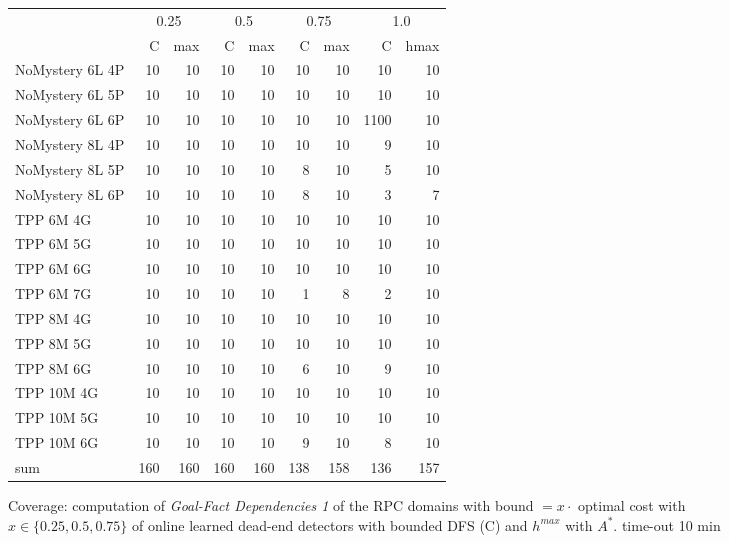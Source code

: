 \setlength{\tabcolsep}{1pt}
\begin{figure}[ht]
	\centering
	\scriptsize
	\begin{tabular}{l|rr|rr|rr|rr}
			& \multicolumn{2}{c}{0.25} & \multicolumn{2}{|c}{0.5} & \multicolumn{2}{|c}{0.75}& \multicolumn{2}{|c}{1.0}\\
		& C & max & C & max & C & max & C & hmax\\\hline
		NoMystery 6L 4P & 10 & 10 & 10 & 10 & 10 & 10 & 10 & 10\\
		NoMystery 6L 5P & 10 & 10 & 10 & 10 & 10 & 10 & 10 & 10\\
		NoMystery 6L 6P & 10 & 10 & 10 & 10 & 10 & 10 & 1100 & 10\\
		NoMystery 8L 4P & 10 & 10 & 10 & 10 & 10 & 10 & 9 & 10\\
		NoMystery 8L 5P & 10 & 10 & 10 & 10 & 8 & 10 & 5 & 10\\
		NoMystery 8L 6P & 10 & 10 & 10 & 10 & 8 & 10 & 3 & 7\\
		TPP 6M 4G & 10 & 10 & 10 & 10 & 10 & 10 & 10 & 10\\
		TPP 6M 5G & 10 & 10 & 10 & 10 & 10 & 10 & 10 & 10\\
		TPP 6M 6G & 10 & 10 & 10 & 10 & 10 & 10 & 10 & 10\\
		TPP 6M 7G & 10 & 10 & 10 & 10 & 1 & 8 & 2 & 10\\
		TPP 8M 4G & 10 & 10 & 10 & 10 & 10 & 10 & 10 & 10\\
		TPP 8M 5G & 10 & 10 & 10 & 10 & 10 & 10 & 10 & 10\\
		TPP 8M 6G & 10 & 10 & 10 & 10 & 6 & 10 & 9 & 10\\
		TPP 10M 4G & 10 & 10 & 10 & 10 & 10 & 10 & 10 & 10\\
		TPP 10M 5G & 10 & 10 & 10 & 10 & 10 & 10 & 10 & 10\\
		TPP 10M 6G & 10 & 10 & 10 & 10 & 9 & 10 & 8 & 10\\\hline
		sum \numtasks{160} & 160 & 160 & 160 & 160 & 138 & 158 & 136 & 157\\
	\end{tabular}
	\caption{Coverage: computation of \emph{Goal-Fact Dependencies 1} of the RPC 
		domains with bound $ = x \cdot $ optimal cost with $ x \in \{0.25, 0.5, 0.75\}$
	of online learned dead-end detectors with bounded DFS (C) and $h^{max}$ with $A^*$. 
	time-out 10 min}
\end{figure}

